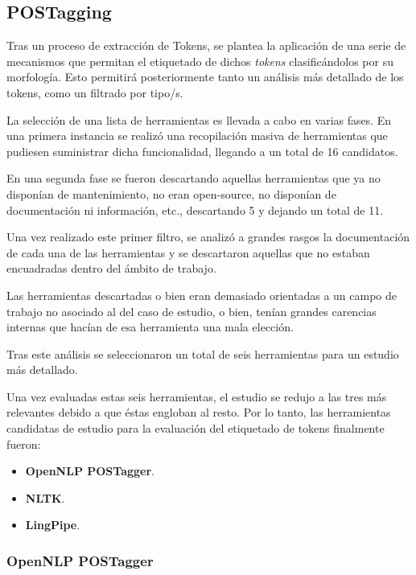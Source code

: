 \documentclass[runningheads,a4paper]{llncs}
\theoremstyle{break}
\begin{document}
\subsection{POSTagging}

Tras un proceso de extracción de Tokens, se plantea la aplicación de una serie de mecanismos que permitan el etiquetado de dichos \textit{tokens} clasificándolos por su morfología. Esto permitirá posteriormente tanto un análisis más detallado de los tokens, como un filtrado por tipo/s.

La selección de una lista de herramientas es llevada a cabo en varias fases. En una primera instancia se realizó una recopilación masiva de herramientas que pudiesen suministrar dicha funcionalidad, llegando a un total de 16 candidatos. 

En una segunda fase se fueron descartando aquellas herramientas que ya no disponían de mantenimiento, no eran open-source, no disponían de documentación ni información, etc., descartando 5 y dejando un total de 11.

Una vez realizado este primer filtro, se analizó a grandes rasgos la documentación de cada una de las herramientas y se descartaron aquellas que no estaban encuadradas dentro del ámbito de trabajo.

Las herramientas descartadas o bien eran demasiado orientadas a un campo de trabajo no asociado al del caso de estudio, o bien, tenían grandes carencias internas que hacían de esa herramienta una mala elección.

Tras este análisis se seleccionaron un total de seis herramientas para un estudio más detallado.

Una vez evaluadas estas seis herramientas, el estudio se redujo a las tres más relevantes debido a que éstas engloban al resto. Por lo tanto, las herramientas candidatas de estudio para la evaluación del etiquetado de tokens finalmente fueron:
\textbf{}\\

\begin{itemize}
  \item \textbf{OpenNLP POSTagger}.
  \item \textbf{NLTK}.
  \item \textbf{LingPipe}.
\end{itemize}

\subsubsection{OpenNLP POSTagger}
\textbf{}
\end{document}

